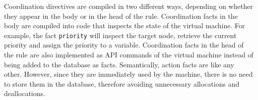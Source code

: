 Coordination directives are compiled in two different ways, depending on whether
they appear in the body or in the head of the rule. Coordination facts in the
body are compiled into code that inspects the state of the virtual machine. For
example, the fact \texttt{priority} will inspect the target node, retrieve the
current priority and assign the priority to a variable.  Coordination facts in
the head of the rule are also implemented as API commands of the virtual
machine instead of being added to the database as facts. Semantically, action
facts are like any other. However, since they are immediately used by the
machine, there is no need to store them in the database, therefore avoiding
unnecessary allocations and deallocations.

